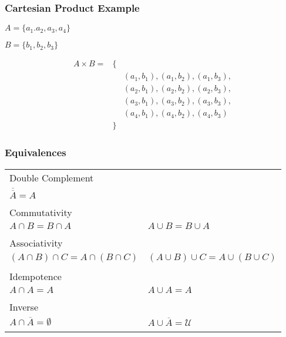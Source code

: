 \documentclass[dvipsnames]{beamer}
\begin{document}
\begin{frame}
  \frametitle{Cartesian Product Example}

  \begin{example}
    $A = \{a_1.a_2,a_3,a_4\}$

    $B = \{b_1,b_2,b_3\}$

    \medskip
    \begin{eqnarray*}
      A \times B = & \{ & \\
                   &    & (a_1,b_1),(a_1,b_2),(a_1,b_3),\\
                   &    & (a_2,b_1),(a_2,b_2),(a_2,b_3),\\
                   &    & (a_3,b_1),(a_3,b_2),(a_3,b_3),\\
                   &    & (a_4,b_1),(a_4,b_2),(a_4,b_3)\\
                   & \} &
    \end{eqnarray*}
  \end{example}
\end{frame}

\begin{frame}
  \frametitle{Equivalences}

  \begin{tabular}{ll}
    \alert{Double Complement} &\\
      $\overline{\overline{A}} = A$\\\\
    \pause
    \alert{Commutativity} &\\
      $A \cap B = B \cap A$ &
      $A \cup B = B \cup A$\\\\
    \pause
    \alert{Associativity} &\\
      $(A \cap B) \cap C = A \cap (B \cap C)$ &
      $(A \cup B) \cup C = A \cup (B \cup C)$\\\\
    \pause
    \alert{Idempotence} &\\
      $A \cap A = A$ &
      $A \cup A = A$\\\\
    \pause
    \alert{Inverse} &\\
      $A \cap \overline{A} = \emptyset$ &
      $A \cup \overline{A} = \mathcal{U}$\\\\
  \end{tabular}
\end{frame}
\end{document}

